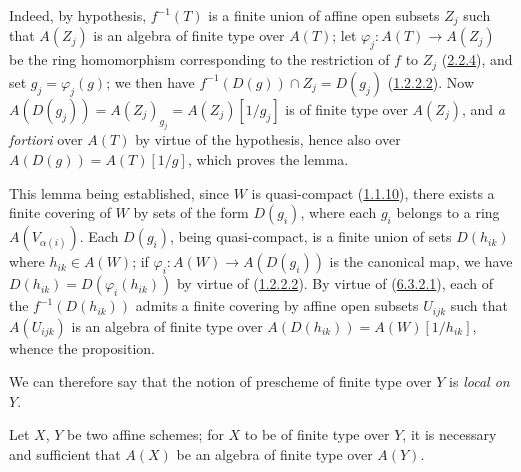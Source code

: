 Indeed, by hypothesis, $f^{-1}(T)$ is a finite union of affine open subsets
$Z_j$ such that $A(Z_j)$ is an algebra of finite type over $A(T)$; let
$\varphi_j:A(T)\to A(Z_j)$ be the ring homomorphism corresponding to the
restriction of $f$ to $Z_j$ (\hyperref[I.2.2.4]{2.2.4}), and set
$g_j=\varphi_j(g)$; we then have
$f^{-1}(D(g))\cap Z_j=D(g_j)$
(\hyperref[I.1.2.2.2]{1.2.2.2}). Now
$A(D(g_j))=A(Z_j)_{g_j}=A(Z_j)[1/g_j]$ is of finite type over $A(Z_j)$, and
\emph{a fortiori} over $A(T)$ by virtue of the hypothesis, hence also over
$A(D(g))=A(T)[1/g]$, which proves the lemma.

This lemma being established, since $W$ is quasi-compact
(\hyperref[I.1.1.10]{1.1.10}), there exists a finite covering of $W$ by
sets of the form $D(g_i)$, where each $g_i$ belongs to a ring
$A(V_{\alpha(i)})$. Each $D(g_i)$, being quasi-compact, is a finite union
of sets $D(h_{ik})$ where $h_{ik}\in A(W)$; if
$\varphi_i:A(W)\to A(D(g_i))$ is the canonical map, we have
$D(h_{ik})=D(\varphi_i(h_{ik}))$ by virtue of
(\hyperref[I.1.2.2.2]{1.2.2.2}). By virtue of
(\hyperref[I.6.3.2.1]{6.3.2.1}), each of the
$f^{-1}(D(h_{ik}))$ admits a finite covering by affine open subsets
$U_{ijk}$ such that $A(U_{ijk})$ is an algebra of finite type over
$A(D(h_{ik}))=A(W)[1/h_{ik}]$, whence the proposition.

We can therefore say that the notion of prescheme of finite type over $Y$ is
\emph{local on $Y$}.

\begin{proposition}[6.3.3]
\label{I.6.3.3}
Let $X$, $Y$ be two affine schemes; for $X$ to be of finite type over
$Y$, it is necessary and sufficient that $A(X)$ be an algebra of finite type
over $A(Y)$.
\end{proposition}

